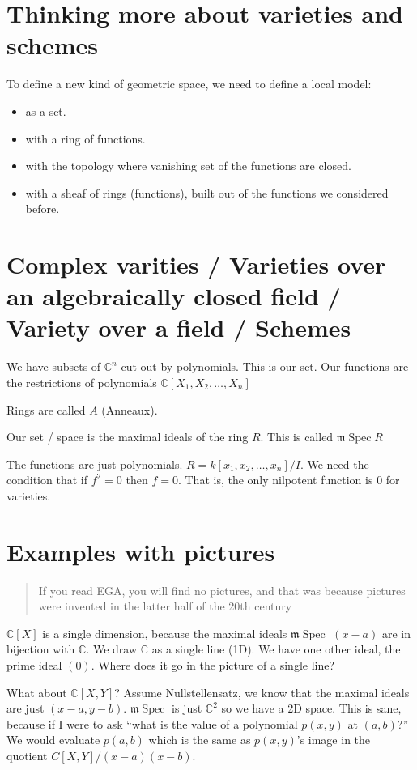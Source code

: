 \documentclass{book}
\newcommand{\C}{\ensuremath{\mathbb{C}}}
\newcommand{\m}{\mathfrak{m}}
\newcommand{\mSpec}{\m\operatorname{Spec}}
\newcommand{\mspec}{\m\operatorname{Spec}}
\theoremstyle{definition}
\begin{document}
\section{Thinking more about varieties and schemes}
To define a new kind of geometric space, we need to define a local model:
\begin{itemize}
        \item as a set.
        \item with a ring of functions.
        \item with the topology where vanishing set of the functions are closed.
        \item with a sheaf of rings (functions), built out of the functions we considered before.
\end{itemize}

\section{Complex varities / Varieties over an algebraically closed field / Variety over a field / Schemes}
We have subsets of $\C^n$ cut out by polynomials. This is our set.
Our functions are the restrictions of polynomials $\C[X_1, X_2, \dots, X_n]$

Rings are called $A$ (Anneaux).

Our set / space is the maximal ideals of the ring $R$. This is called $\mspec R$

The functions are just polynomials. $R = k[x_1, x_2, \dots, x_n] / I$. We need
the condition that if $f^2 = 0$ then $f = 0$. That is, the only nilpotent function
is $0$ for varieties.


\section{Examples with pictures}

\begin{quote}
If you read EGA, you will find no pictures, and that was because pictures
were invented in the latter half of the 20th century
\end{quote}

$\C[X]$ is a single dimension, because the maximal ideals $\mSpec$ $(x - a)$ are
in bijection with $\mathbb C$. We draw $\mathbb C$ as a single line (1D).
We have one other ideal, the prime ideal $(0)$. Where does it go in the picture of a single line?

What about $\C[X, Y]$? Assume Nullstellensatz, we know that the maximal ideals
are just $(x-a, y-b)$. $\mSpec$ is just $\C^2$ so we have a 2D space. This is sane,
because if I were to ask ``what is the value of a polynomial $p(x, y)$ at $(a, b)$?'' We would
evaluate $p(a, b)$ which is the same as $p(x, y)$'s image in the quotient $C[X, Y]/(x-a)(x-b)$.
\end{document}
